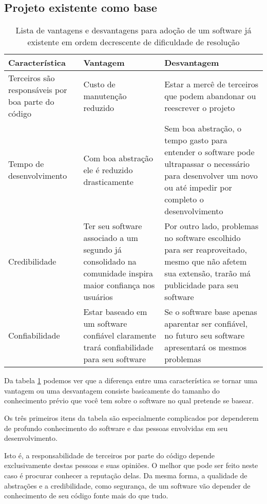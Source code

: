 \documentclass[12pt]{article}
\begin{document}
  \newpage
  \subsection{Projeto existente como base} \label{subsec:projeto-existente}
  \begin{table}[ht]
    \centering
    \caption{Lista de vantagens e desvantagens para adoção de um software já existente em ordem decrescente de dificuldade de resolução}
    \label{tab:projeto-existente}

    \begin{tabularx}{\textwidth}{| X | X | X |}
      \hline
      \textbf{Característica} & \textbf{Vantagem} & \textbf{Desvantagem} \\ \hline
      Terceiros são responsáveis por boa parte do código & 
        Custo de manutenção reduzido &
        Estar a mercê de terceiros que podem abandonar ou reescrever o projeto \\ \hline
      Tempo de desenvolvimento &
        Com boa abstração ele é reduzido drasticamente &
        Sem boa abstração, o tempo gasto para entender o software pode ultrapassar o necessário para desenvolver um novo ou até impedir por completo o desenvolvimento \\ \hline
      Credibilidade &
        Ter seu software associado a um segundo já consolidado na comunidade inspira maior confiança nos usuários &
        Por outro lado, problemas no software escolhido para ser reaproveitado, mesmo que não afetem sua extensão, trarão má publicidade para seu software\\ \hline
      Confiabilidade &
        Estar baseado em um software confiável claramente trará confiabilidade para seu software &
        Se o software base apenas aparentar ser confiável, no futuro seu software apresentará os mesmos problemas\\ \hline
    \end{tabularx}
  \end{table}

  Da tabela \ref{tab:projeto-existente} podemos ver que a diferença entre uma característica se tornar uma vantagem ou uma desvantagem consiste basicamente do tamanho do conhecimento prévio que você tem sobre o software no qual pretende se basear.

  Os três primeiros itens da tabela são especialmente complicados por dependerem de profundo conhecimento do software e das pessoas envolvidas em seu desenvolvimento.

  Isto é, a responsabilidade de terceiros por parte do código depende exclusivamente destas pessoas e suas opiniões. O melhor que pode ser feito neste caso é procurar conhecer a reputação delas. Da mesma forma, a qualidade de abstrações e a credibilidade, como segurança, de um software vão depender de conhecimento de seu código fonte mais do que tudo.
\end{document}
